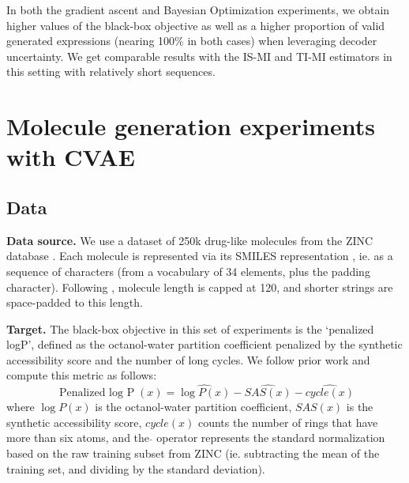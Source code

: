 In both the gradient ascent and Bayesian Optimization experiments, we obtain higher values of the black-box objective as well as a higher proportion of valid generated expressions (nearing 100\% in both cases) when leveraging decoder uncertainty. We get comparable results with the IS-MI and TI-MI estimators in this setting with relatively short sequences.


\section{Molecule generation experiments with CVAE}
\label{Appendix_D_Molecule_CVAE}

\subsection{Data}
\label{Appendix_D.1_Molecule_CVAE_Data}

\textbf{Data source.} We use a dataset of 250k drug-like molecules from the ZINC database \cite{Irwin2012ZINCAF}. Each molecule is represented via its SMILES representation \cite{weininger88smiles}, ie. as a sequence of characters (from a vocabulary of 34 elements, plus the padding character). Following \cite{Gomez_Bombarelli_2018}, molecule length is capped at 120, and shorter strings are space-padded to this length.

\textbf{Target.} The black-box objective in this set of experiments is the `penalized logP', defined as the octanol-water partition coefficient penalized by the synthetic accessibility score and the number of long cycles. We follow prior work \cite{kusner2017grammar, dai2018syntaxdirected, jin2019junction, liu2020chanceconstrained} and compute this metric as follows:
\begin{equation}
    \text{Penalized $\log$ P}(x) = \widehat{\log P(x)} - \widehat{SAS(x)} - \widehat{cycle(x)}
\end{equation}
where $\log P(x)$ is the octanol-water partition coefficient, $SAS(x)$ is the synthetic accessibility score, $cycle(x)$ counts the number of rings that have more than six atoms, and the\; $\widehat{    }$\; operator represents the standard normalization based on the raw training subset from ZINC (ie. subtracting the mean of the training set, and dividing by the standard deviation).

